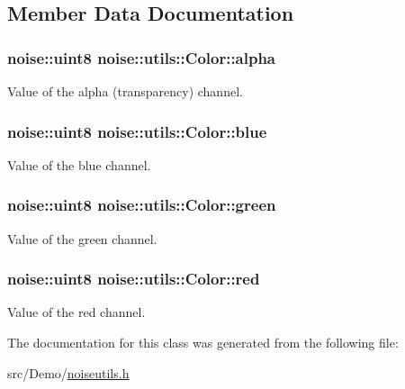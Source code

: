 \subsection{Member Data Documentation}
\hypertarget{classnoise_1_1utils_1_1_color_a2a904dbc3f6423786774bdd009fec799}{
\subsubsection[{alpha}]{\setlength{\rightskip}{0pt plus 5cm}noise\+::uint8 noise\+::utils\+::\+Color\+::alpha}}\label{classnoise_1_1utils_1_1_color_a2a904dbc3f6423786774bdd009fec799}


Value of the alpha (transparency) channel. 

\hypertarget{classnoise_1_1utils_1_1_color_a231abbccd4c46f2ef93c25a1b904c596}{
\subsubsection[{blue}]{\setlength{\rightskip}{0pt plus 5cm}noise\+::uint8 noise\+::utils\+::\+Color\+::blue}}\label{classnoise_1_1utils_1_1_color_a231abbccd4c46f2ef93c25a1b904c596}


Value of the blue channel. 

\hypertarget{classnoise_1_1utils_1_1_color_a5c8b2568a4f0bb14283004cbab3b2d58}{
\subsubsection[{green}]{\setlength{\rightskip}{0pt plus 5cm}noise\+::uint8 noise\+::utils\+::\+Color\+::green}}\label{classnoise_1_1utils_1_1_color_a5c8b2568a4f0bb14283004cbab3b2d58}


Value of the green channel. 

\hypertarget{classnoise_1_1utils_1_1_color_aab880707476cfd17cf143b80e21bbb50}{
\subsubsection[{red}]{\setlength{\rightskip}{0pt plus 5cm}noise\+::uint8 noise\+::utils\+::\+Color\+::red}}\label{classnoise_1_1utils_1_1_color_aab880707476cfd17cf143b80e21bbb50}


Value of the red channel. 



The documentation for this class was generated from the following file\+:\begin{DoxyCompactItemize}
\item 
src/\+Demo/\hyperlink{_demo_2noiseutils_8h}{noiseutils.\+h}\end{DoxyCompactItemize}
